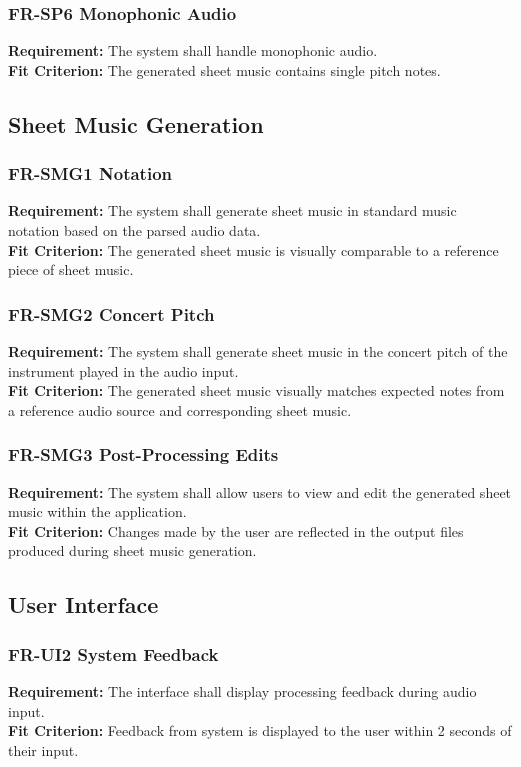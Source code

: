 \documentclass[12pt]{article}
\begin{document}
\subsubsection*{FR-SP6 Monophonic Audio}
\textbf{Requirement:} The system shall handle monophonic audio. \\
\textbf{Fit Criterion:} The generated sheet music contains single pitch notes.

\subsection{Sheet Music Generation}
\subsubsection*{FR-SMG1 Notation}
\textbf{Requirement:} The system shall generate sheet music in standard music notation based on the parsed audio data. \\
\textbf{Fit Criterion:} The generated sheet music is visually comparable to a reference piece of sheet music.
\subsubsection*{FR-SMG2 Concert Pitch}
\textbf{Requirement:} The system shall generate sheet music in the concert pitch of the instrument played in the audio input. \\
\textbf{Fit Criterion:} The generated sheet music visually matches expected notes from a reference audio source and corresponding sheet music.
\subsubsection*{FR-SMG3 Post-Processing Edits}
\textbf{Requirement:} The system shall allow users to view and edit the generated sheet music within the application. \\
\textbf{Fit Criterion:} Changes made by the user are reflected in the output files produced during sheet music generation.

\subsection{User Interface}
\subsubsection*{FR-UI2 System Feedback}
\textbf{Requirement:} The interface shall display processing feedback during audio input. \\
\textbf{Fit Criterion:} Feedback from system is displayed to the user within 2 seconds of their input.
\end{document}
